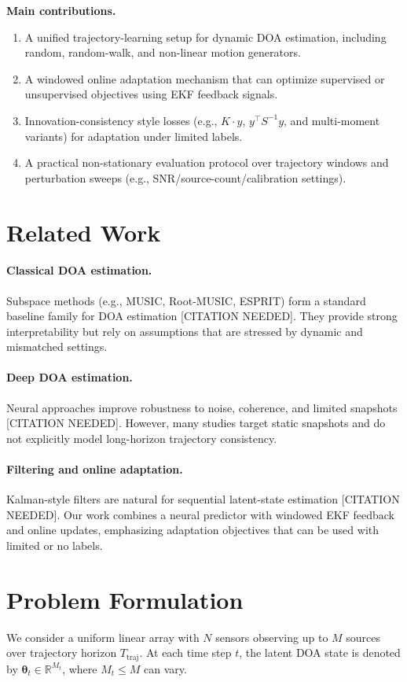 \documentclass{article}
\begin{document}
\textbf{Main contributions.}
\begin{enumerate}[leftmargin=*,itemsep=2pt]
    \item A unified trajectory-learning setup for dynamic DOA estimation, including random, random-walk, and non-linear motion generators.
    \item A windowed online adaptation mechanism that can optimize supervised or unsupervised objectives using EKF feedback signals.
    \item Innovation-consistency style losses (e.g., $K\!\cdot\!y$, $y^\top S^{-1} y$, and multi-moment variants) for adaptation under limited labels.
    \item A practical non-stationary evaluation protocol over trajectory windows and perturbation sweeps (e.g., SNR/source-count/calibration settings).
\end{enumerate}

\section{Related Work}
\paragraph{Classical DOA estimation.}
Subspace methods (e.g., MUSIC, Root-MUSIC, ESPRIT) form a standard baseline family for DOA estimation [CITATION NEEDED].
They provide strong interpretability but rely on assumptions that are stressed by dynamic and mismatched settings.

\paragraph{Deep DOA estimation.}
Neural approaches improve robustness to noise, coherence, and limited snapshots [CITATION NEEDED].
However, many studies target static snapshots and do not explicitly model long-horizon trajectory consistency.

\paragraph{Filtering and online adaptation.}
Kalman-style filters are natural for sequential latent-state estimation [CITATION NEEDED].
Our work combines a neural predictor with windowed EKF feedback and online updates, emphasizing adaptation objectives that can be used with limited or no labels.

\section{Problem Formulation}
We consider a uniform linear array with $N$ sensors observing up to $M$ sources over trajectory horizon $T_{\text{traj}}$.
At each time step $t$, the latent DOA state is denoted by $\boldsymbol{\theta}_t \in \mathbb{R}^{M_t}$, where $M_t \le M$ can vary.
\end{document}
